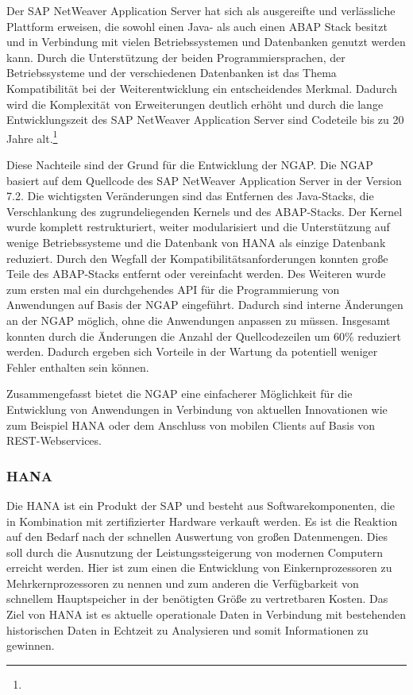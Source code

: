 \begin{onehalfspacing}
Der SAP NetWeaver Application Server hat sich als ausgereifte und verlässliche Plattform erweisen, die sowohl einen Java- als auch einen ABAP Stack besitzt und in Verbindung mit vielen Betriebssystemen und Datenbanken genutzt werden kann. Durch die Unterstützung der beiden Programmiersprachen, der Betriebssysteme und der verschiedenen Datenbanken ist das Thema Kompatibilität bei der Weiterentwicklung ein entscheidendes Merkmal. Dadurch wird die Komplexität von Erweiterungen deutlich erhöht und durch die lange Entwicklungszeit des SAP NetWeaver Application Server sind Codeteile bis zu 20 Jahre alt.\footnote{ }

Diese Nachteile sind der Grund für die Entwicklung der \gls{NGAP}. Die \gls{NGAP} basiert auf dem Quellcode des SAP NetWeaver Application Server in der Version 7.2. Die wichtigsten Veränderungen sind das Entfernen des Java-Stacks, die Verschlankung des zugrundeliegenden Kernels und des ABAP-Stacks. Der Kernel wurde komplett restrukturiert, weiter modularisiert und die Unterstützung auf wenige Betriebssysteme und die Datenbank von \gls{HANA} als einzige Datenbank reduziert. Durch den Wegfall der Kompatibilitätsanforderungen konnten große Teile des ABAP-Stacks entfernt oder vereinfacht werden. Des Weiteren wurde zum ersten mal ein durchgehendes API für die Programmierung von Anwendungen auf Basis der \gls{NGAP} eingeführt. Dadurch sind interne Änderungen an der \gls{NGAP} möglich, ohne die Anwendungen anpassen zu müssen. Insgesamt konnten durch die Änderungen die Anzahl der Quellcodezeilen um 60\% reduziert werden. Dadurch ergeben sich Vorteile in der Wartung da potentiell weniger Fehler enthalten sein können.

Zusammengefasst bietet die \gls{NGAP} eine einfacherer Möglichkeit für die Entwicklung von Anwendungen in Verbindung von aktuellen Innovationen wie zum Beispiel \gls{HANA} oder dem Anschluss von mobilen Clients auf Basis von REST-Webservices.

\subsubsection{HANA} %
Die \gls{HANA} ist ein Produkt der SAP und besteht aus Softwarekomponenten, die in Kombination mit zertifizierter Hardware verkauft werden. Es ist die Reaktion auf den Bedarf nach der schnellen Auswertung von großen Datenmengen. Dies soll durch die Ausnutzung der Leistungssteigerung von modernen Computern erreicht werden. Hier ist zum einen die Entwicklung von Einkernprozessoren zu Mehrkernprozessoren zu nennen und zum anderen die Verfügbarkeit von schnellem Hauptspeicher in der benötigten Größe zu vertretbaren Kosten. Das Ziel von \gls{HANA} ist es aktuelle operationale Daten in Verbindung mit bestehenden historischen Daten in Echtzeit zu Analysieren und somit Informationen zu gewinnen.


\end{onehalfspacing}
